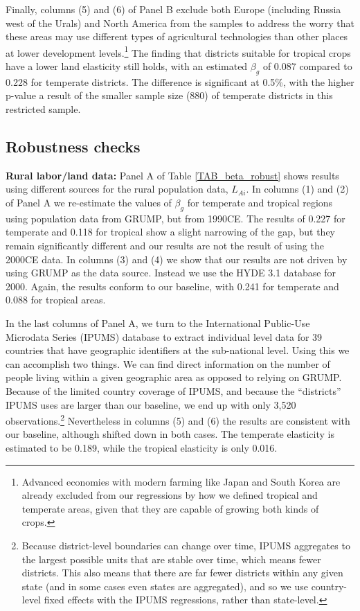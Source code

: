 \documentclass[11pt]{article}
\begin{document}
Finally, columns (5) and (6) of Panel B exclude both Europe (including Russia west of the Urals) and North America from the samples to address the worry that these areas may use different types of agricultural technologies than other places at lower development levels.\footnote{Advanced economies with modern farming like Japan and South Korea are already excluded from our regressions by how we defined tropical and temperate areas, given that they are capable of growing both kinds of crops.} The finding that districts suitable for tropical crops have a lower land elasticity still holds, with an estimated $\beta_g$ of 0.087 compared to 0.228 for temperate districts. The difference is significant at 0.5\%, with the higher p-value a result of the smaller sample size (880) of temperate districts in this restricted sample.

\subsection{Robustness checks}
\noindent\textbf{Rural labor/land data:} Panel A of Table \ref{TAB_beta_robust} shows results using different sources for the rural population data, $L_{Ai}$. In columns (1) and (2) of Panel A we re-estimate the values of $\beta_g$ for temperate and tropical regions using population data from GRUMP, but from 1990CE. The results of 0.227 for temperate and 0.118 for tropical show a slight narrowing of the gap, but they remain significantly different and our results are not the result of using the 2000CE data. In columns (3) and (4) we show that our results are not driven by using GRUMP as the data source. Instead we use the HYDE 3.1 database \citep{hyde31} for 2000. Again, the results conform to our baseline, with 0.241 for temperate and 0.088 for tropical areas. 

In the last columns of Panel A, we turn to the International Public-Use Microdata Series (IPUMS) database \nocite{ipums} to extract individual level data for 39 countries that have geographic identifiers at the sub-national level. Using this we can accomplish two things. We can find direct information on the number of people living within a given geographic area as opposed to relying on GRUMP. Because of the limited country coverage of IPUMS, and because the ``districts'' IPUMS uses are larger than our baseline, we end up with only 3,520 observations.\footnote{Because district-level boundaries can change over time, IPUMS aggregates to the largest possible units that are stable over time, which means fewer districts. This also means that there are far fewer districts within any given state (and in some cases even states are aggregated), and so we use country-level fixed effects with the IPUMS regressions, rather than state-level.} Nevertheless in columns (5) and (6) the results are consistent with our baseline, although shifted down in both cases. The temperate elasticity is estimated to be 0.189, while the tropical elasticity is only 0.016. 
\end{document}
